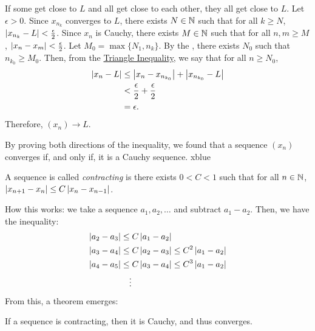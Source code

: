 {\begin{itemize}
              If some get close to \(L\) and all get close to each other, they all get close to \(L\). Let \(\epsilon > 0\). Since \(x_{n_k}\) converges to \(L\), there exists \(N \in \mathbb{N}\) such that for all \(k \geq N\), \(\left|x_{n_k} - L\right| < \frac{\epsilon}{2}\). Since \(x_n\) is Cauchy, there exists \(M \in \mathbb{N}\) such that for all \(n,m \geq M\), \(\left|x_n - x_m\right| < \frac{\epsilon}{2}\). Let \(M_0 = \max \{N_1, n_k\}\). By the , there exists \(N_0\) such that \(n_{k_0} \geq M_0\). Then, from the \hyperlink{Triangle Inequality}{Triangle Inequality}, we say that for all \(n \geq N_0\), \begin{align*}
                  \left|x_n - L\right| & \leq \left|x_n - x_{n_{k_0}}\right| + \left|x_{n_{k_0}} - L\right| \\
                                   & < \frac{\epsilon}{2} + \frac{\epsilon}{2}                  \\
                                   & = \epsilon.
              \end{align*} Therefore, \((x_n) \rightarrow L\).
    \end{itemize}}{By proving both directions of the inequality, we found that a sequence \((x_n)\) converges if, and only if, it is a Cauchy sequence.}%
{xblue}%

\begin{definition}
    A sequence is called \textit{contracting} is there exists \(0 < C < 1\) such that for all \(n \in \mathbb{N}\), \(\left|x_{n+1} - x_n\right| \leq C\left|x_n - x_{n-1}\right|\).
\end{definition}

How this works: we take a sequence \(a_1, a_2, \dots\) and subtract \(a_1 - a_2\). Then, we have the inequality: \begin{align*}
    \left|a_2 - a_3\right| & \leq C\left|a_1 - a_2\right|                            \\
    \left|a_3 - a_4\right| & \leq C\left|a_2 - a_3\right| \leq C^2\left|a_1 - a_2\right| \\
    \left|a_4 - a_5\right| & \leq C\left|a_3 - a_4\right| \leq C^3\left|a_1 - a_2\right| \\
                       & \quad \vdots
\end{align*} From this, a theorem emerges:

\begin{theorem}
    If a sequence is contracting, then it is Cauchy, and thus converges.
\end{theorem}

